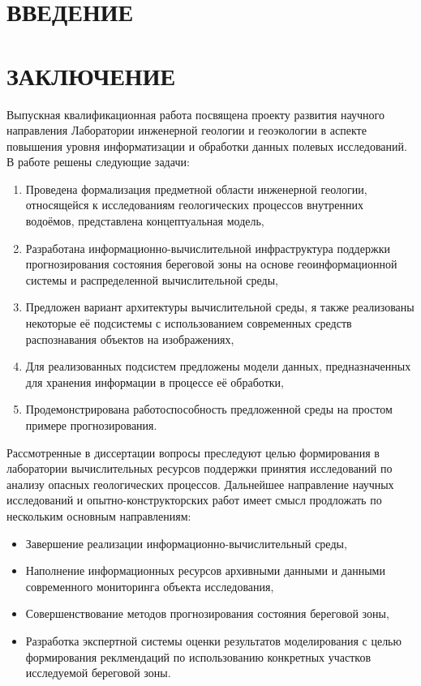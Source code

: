 \documentclass[732,14pt]{studrep}
\begin{document}
\thispagestyle{empty}
\clearpage
 
\tableofcontents

\chapter*{ВВЕДЕНИЕ}
\label{chap:intro}

\chapter*{ЗАКЛЮЧЕНИЕ}

Выпускная квалификационная работа посвящена проекту развития научного направления Лаборатории инженерной геологии и геоэкологии в аспекте повышения уровня информатизации и обработки данных полевых исследований. В работе решены следующие задачи:
\begin{enumerate}
  \item Проведена формализация предметной области инженерной геологии, относящейся к исследованиям геологических процессов внутренних водоёмов, представлена концептуальная модель,
  \item Разработана информационно-вычислительной инфраструктура поддержки прогнозирования состояния береговой зоны на основе геоинформационной системы и распределенной вычислительной среды,
  \item Предложен вариант архитектуры вычислительной среды, я также реализованы некоторые её подсистемы с использованием современных средств распознавания объектов на изображениях,
  \item Для реализованных подсистем предложены модели данных, предназначенных для хранения информации в процессе её обработки,
  \item Продемонстрирована работоспособность предложенной среды на простом примере прогнозирования.
\end{enumerate}

Рассмотренные в диссертации вопросы преследуют целью формирования в лаборатории вычислительных ресурсов поддержки принятия исследований по анализу опасных геологических процессов. Дальнейшее направление научных исследований и опытно-конструкторских работ имеет смысл продложать по нескольким основным направлениям:
\begin{itemize}
  \item Завершение реализации информационно-вычислительный среды,
  \item Наполнение информационных ресурсов архивными данными и данными современного мониторинга объекта исследования,
  \item Совершенствование методов прогнозирования состояния береговой зоны,
  \item Разработка экспертной системы оценки результатов моделирования с целью формирования реклмендаций по использованию конкретных участков исследуемой береговой зоны.
\end{itemize}
\end{document}
